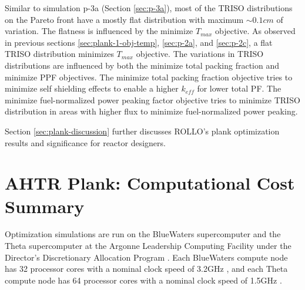 Similar to simulation p-3a (Section \ref{sec:p-3a}), most of the \gls{TRISO} distributions 
on the Pareto front have a mostly flat distribution with maximum $\sim0.1cm$ of 
variation. 
The flatness is influenced by the minimize $T_{max}$ objective. 
As observed in previous sections \ref{sec:plank-1-obj-temp}, \ref{sec:p-2a}, and 
\ref{sec:p-2c}, a flat \gls{TRISO} distribution minimizes $T_{max}$ objective.
The variations in \gls{TRISO} distributions are influenced by both the minimize 
total packing fraction and minimize PPF objectives. 
The minimize total packing fraction objective tries to minimize self shielding effects 
to enable a higher $k_{eff}$ for lower total PF. 
The minimize fuel-normalized power peaking factor objective tries to minimize 
TRISO distribution in areas with higher flux to minimize fuel-normalized power peaking.

Section \ref{sec:plank-discussion} further discusses \gls{ROLLO}'s plank 
optimization results and significance for reactor designers.

\pagebreak
\section{AHTR Plank: Computational Cost Summary}
\label{sec:plank-compute-cost}
Optimization simulations are run on the BlueWaters supercomputer \cite{ncsa_about_2017} and
the Theta supercomputer at the Argonne Leadership Computing Facility under the Director's 
Discretionary Allocation Program \cite{noauthor_argonne_2022}. 
Each BlueWaters compute node has 32 processor cores with a nominal clock speed of 3.2GHz
\cite{ncsa_about_2017}, and each Theta compute node has 64 processor cores with a nominal 
clock speed of 1.5GHz \cite{noauthor_argonne_2022}.  

